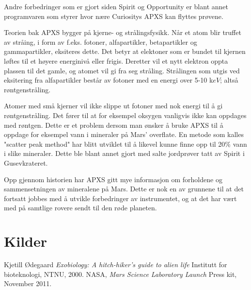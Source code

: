 \documentclass[5p]{elsarticle}
\begin{document}
Andre forbedringer som er gjort siden Spirit og Opportunity er blant annet programvaren som styrer hvor nære Curiositys APXS kan flyttes prøvene.

Teorien bak APXS bygger på kjerne- og strålingsfysikk.
Når et atom blir truffet av stråing, i form av f.eks. fotoner, alfapartikler, betapartikler og gammapartikler, eksiteres dette.
Det betyr at elektoner som er bundet til kjernen løftes til et høyere energinivå eller frigis.
Deretter vil et nytt elektron oppta plassen til det gamle, og atomet vil gi fra seg stråling.
Strålingen som utgis ved eksitering fra alfapartikler består av fotoner med en energi over 5-10 k$eV$; altså røntgenstråling.

Atomer med små kjerner vil ikke slippe ut fotoner med nok energi til å gi røntgenstråling.
Det fører til at for eksempel oksygen vanligvis ikke kan oppdages med røntgen.
Dette er et problem dersom man ønsker å bruke APXS til å oppdage for eksempel vann i mineraler på Mars' overflate.
En metode som kalles "scatter peak method" har blitt utviklet til å likevel kunne finne opp til 20\% vann i slike mineraler.
Dette ble blant annet gjort med salte jordprøver tatt av Spirit i Gusevkrateret.

Opp gjennom historien har APXS gitt mye informasjon om forholdene og sammensetningen av mineralene på Mars.
Dette er nok en av grunnene til at det fortsatt jobbes med å utvikle forbedringer av instrumentet, og at det har vært med på samtlige rovere sendt til den røde planeten.

\section*{Kilder}

\begin{thebibliography}{99}	%
		Kjetill Ødegaard
		\emph{Exobiology: A hitch-hiker's guide to alien life}
		Institutt for bioteknologi,
		NTNU,
		2000.
		NASA,
		\emph{Mars Science Laboratory Launch}
		Press kit,
		November 2011.
\end{thebibliography}
\end{document}
